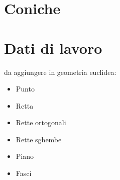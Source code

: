 \documentclass[a4paper]{book}
\begin{document}
\chapter{Coniche}  

\chapter{Dati di lavoro}
da aggiungere in geometria euclidea:
\begin{itemize}
	\item Punto
	\item Retta
	\item Rette ortogonali
	\item Rette sghembe
	\item Piano
	\item Fasci
\end{itemize}



\backmatter
\end{document}
